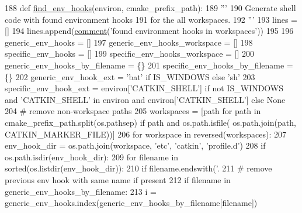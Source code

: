 \begin{DoxyCode}
188 \textcolor{keyword}{def }\hyperlink{namespace__setup__util_a73de35ca77f260af6691470342ab49ce}{find\_env\_hooks}(environ, cmake\_prefix\_path):
189     \textcolor{stringliteral}{'''}
190 \textcolor{stringliteral}{    Generate shell code with found environment hooks}
191 \textcolor{stringliteral}{    for the all workspaces.}
192 \textcolor{stringliteral}{    '''}
193     lines = []
194     lines.append(\hyperlink{namespace__setup__util_abe8c95c4cfe8b1374dacd5f91d984353}{comment}(\textcolor{stringliteral}{'found environment hooks in workspaces'}))
195 
196     generic\_env\_hooks = []
197     generic\_env\_hooks\_workspace = []
198     specific\_env\_hooks = []
199     specific\_env\_hooks\_workspace = []
200     generic\_env\_hooks\_by\_filename = \{\}
201     specific\_env\_hooks\_by\_filename = \{\}
202     generic\_env\_hook\_ext = \textcolor{stringliteral}{'bat'} \textcolor{keywordflow}{if} IS\_WINDOWS \textcolor{keywordflow}{else} \textcolor{stringliteral}{'sh'}
203     specific\_env\_hook\_ext = environ[\textcolor{stringliteral}{'CATKIN\_SHELL'}] \textcolor{keywordflow}{if} \textcolor{keywordflow}{not} IS\_WINDOWS \textcolor{keywordflow}{and} \textcolor{stringliteral}{'CATKIN\_SHELL'} \textcolor{keywordflow}{in} environ \textcolor{keywordflow}{and} 
      environ[\textcolor{stringliteral}{'CATKIN\_SHELL'}] \textcolor{keywordflow}{else} \textcolor{keywordtype}{None}
204     \textcolor{comment}{# remove non-workspace paths}
205     workspaces = [path \textcolor{keywordflow}{for} path \textcolor{keywordflow}{in} cmake\_prefix\_path.split(os.pathsep) \textcolor{keywordflow}{if} path \textcolor{keywordflow}{and} os.path.isfile(
      os.path.join(path, CATKIN\_MARKER\_FILE))]
206     \textcolor{keywordflow}{for} workspace \textcolor{keywordflow}{in} reversed(workspaces):
207         env\_hook\_dir = os.path.join(workspace, \textcolor{stringliteral}{'etc'}, \textcolor{stringliteral}{'catkin'}, \textcolor{stringliteral}{'profile.d'})
208         \textcolor{keywordflow}{if} os.path.isdir(env\_hook\_dir):
209             \textcolor{keywordflow}{for} filename \textcolor{keywordflow}{in} sorted(os.listdir(env\_hook\_dir)):
210                 \textcolor{keywordflow}{if} filename.endswith(\textcolor{stringliteral}{'.%
211                     \textcolor{comment}{# remove previous env hook with same name if present}
212                     \textcolor{keywordflow}{if} filename \textcolor{keywordflow}{in} generic\_env\_hooks\_by\_filename:
213                         i = generic\_env\_hooks.index(generic\_env\_hooks\_by\_filename[filename])
}
\end{DoxyCode}
